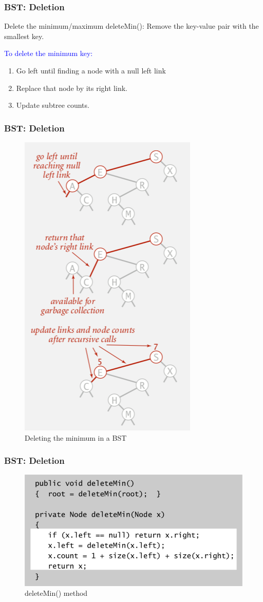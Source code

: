 \documentclass[11pt]{beamer}
\begin{document}
   \begin{frame}
   	\frametitle{BST: Deletion} 
   	 \begin{block}{Delete the minimum/maximum}
   	 deleteMin(): Remove the key-value pair with the smallest key.
   	 \end{block}
     \textcolor{blue}{To delete the minimum key:}
    \begin{enumerate}
    	\item Go left until finding a node with a null left link
    	\item Replace that node by its right link.
    	\item Update subtree counts.
    \end{enumerate}	   
   \end{frame}	

    \begin{frame}
   	\frametitle{BST: Deletion} 
   	\begin{figure}
   		\centering
   		\includegraphics[width=0.38\linewidth]{"Screenshot 2020-11-16 at 9.41.40 PM"}
   		\caption{Deleting the minimum in a BST}
   		\label{fig:screenshot-2020-11-16-at-9}
   	\end{figure}  	
   \end{frame}	

   \begin{frame}
  	\frametitle{BST: Deletion} 
  	  \begin{figure}
  	  	\centering
  	  	\includegraphics[width=0.9\linewidth]{"Screenshot 2020-11-16 at 9.41.58 PM"}
  	  	\caption{deleteMin() method}
  	  	\label{fig:screenshot-2020-11-16-at-9}
  	  \end{figure}  
  \end{frame}	
\end{document}
